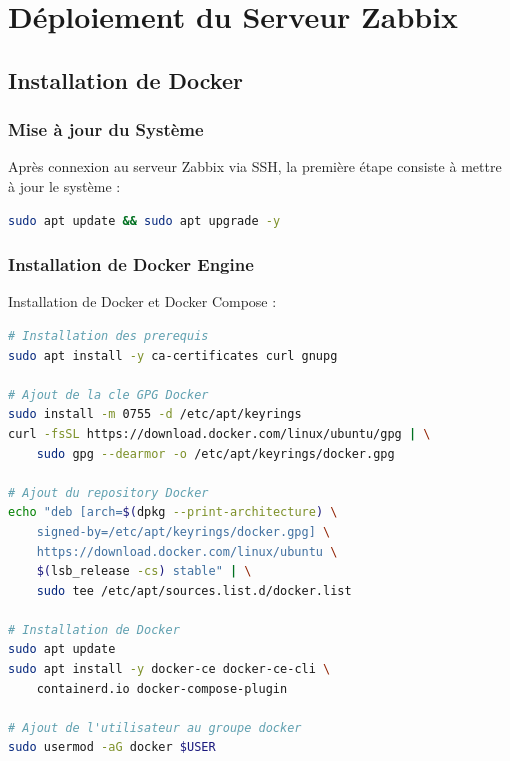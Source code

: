 \chapter{Déploiement du Serveur Zabbix}
\label{chap:zabbix-deployment}

\section{Installation de Docker}

\subsection{Mise à jour du Système}

Après connexion au serveur Zabbix via SSH, la première étape consiste à mettre à jour le système :

\begin{lstlisting}[language=bash, caption=Mise à jour du système]
sudo apt update && sudo apt upgrade -y
\end{lstlisting}

\subsection{Installation de Docker Engine}

Installation de Docker et Docker Compose :

\begin{lstlisting}[language=bash, caption=Installation de Docker]
# Installation des prerequis
sudo apt install -y ca-certificates curl gnupg

# Ajout de la cle GPG Docker
sudo install -m 0755 -d /etc/apt/keyrings
curl -fsSL https://download.docker.com/linux/ubuntu/gpg | \
    sudo gpg --dearmor -o /etc/apt/keyrings/docker.gpg

# Ajout du repository Docker
echo "deb [arch=$(dpkg --print-architecture) \
    signed-by=/etc/apt/keyrings/docker.gpg] \
    https://download.docker.com/linux/ubuntu \
    $(lsb_release -cs) stable" | \
    sudo tee /etc/apt/sources.list.d/docker.list

# Installation de Docker
sudo apt update
sudo apt install -y docker-ce docker-ce-cli \
    containerd.io docker-compose-plugin

# Ajout de l'utilisateur au groupe docker
sudo usermod -aG docker $USER
\end{lstlisting}


